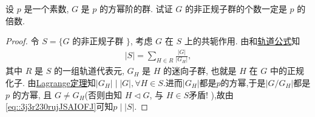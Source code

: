 \documentclass[../../main.tex]{subfiles}%
\begin{document}
\begin{example}
设 $p$ 是一个素数, $G$ 是 $p$ 的方幂阶的群. 试证 $G$ 的非正规子群的个数一定是 $p$ 的倍数.
\end{example}
\begin{proof}

令 $S = \{ G$ 的非正规子群 $\}$, 考虑 $G$ 在 $S$ 上的共轭作用. 由和\hyperref[corollary:有限群轨道的阶与其商掉迷向子群的阶相同]{轨道公式}知
\begin{align}\label{eq::3j3r230rujJSAIOFJ}
|S| = \sum\limits_{H \in R} \frac{|G|}{|G_H|},
\end{align}
其中 $R$ 是 $S$ 的一组轨道代表元, $G_H$ 是 $H$ 的迷向子群, 也就是 $H$ 在 $G$ 中的正规化子. 由\hyperref[theorem:抽象代数--Lagrange定理]{Lagrange定理}知$|G_H|\mid |G|,\forall H\in S$.进而$|G_H|$都是$p$的方幂,于是$|G/G_H|$都是 $p$ 的方幂, 且 $G \neq G_H$(否则由知 $H \lhd G$, 与 $H \in S$矛盾! ),故由\eqref{eq::3j3r230rujJSAIOFJ}可知$p \mid |S|$.

\end{proof}
\end{document}
